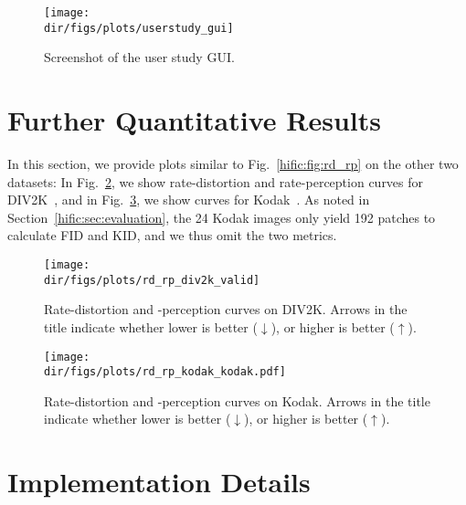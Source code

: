 \begin{subappendices}
\begin{figure}[hb]
    \centering
    \texttt{[image: \\dir/figs/plots/userstudy\_gui]}
    \caption{\label{hific:fig:userstudy_gui}Screenshot of the user study GUI.}
\end{figure}

\FloatBarrier

\section{Further Quantitative Results} \label{hific:sec:supp:furthereval}

In this section, we provide plots similar to Fig.~\ref{hific:fig:rd_rp} on the other two datasets:
In Fig.~\ref{hific:fig:rd_rp_div2k}, we show rate-distortion and rate-perception curves for DIV2K~\cite{agustssondiv2k}, and in Fig.~\ref{hific:fig:rd_rp_kodak}, we show curves for Kodak~\cite{kodakurl}.
As noted in Section~\ref{hific:sec:evaluation}, the 24 Kodak images only yield 192 patches to calculate FID and KID, and we thus omit the two metrics.

\begin{figure}
    \centering
    \texttt{[image: \\dir/figs/plots/rd\_rp\_div2k\_valid]}
    \caption{Rate-distortion and -perception curves on DIV2K. Arrows in the title indicate whether lower is better ($\downarrow$), or higher is better ($\uparrow$).} 
    \label{hific:fig:rd_rp_div2k}
\end{figure}

\begin{figure}
    \centering
    \texttt{[image: \\dir/figs/plots/rd\_rp\_kodak\_kodak.pdf]}
    \caption{Rate-distortion and -perception curves on Kodak. Arrows in the title indicate whether lower is better ($\downarrow$), or higher is better ($\uparrow$).} 
    \label{hific:fig:rd_rp_kodak}
\end{figure}

\newpage


\section{Implementation Details} 


\end{subappendices}
